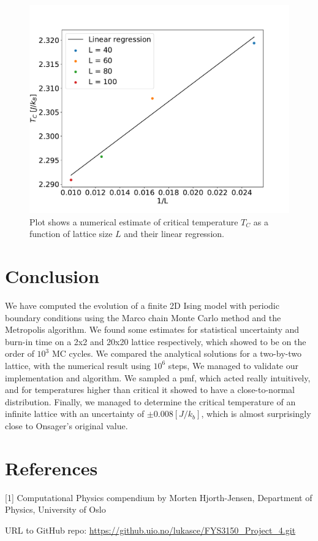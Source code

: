 \documentclass[english,notitlepage,reprint,nofootinbib]{revtex4-1}  %
\begin{document}
\begin{figure}[h!]
    \centering %
    \includegraphics[scale=0.35]{figures/9.pdf} %
    \caption{Plot shows a numerical estimate of critical temperature $T_C$ as a function of lattice size $L$ and their linear regression.}
    \label{fig:8}
\end{figure}
\FloatBarrier






\section{Conclusion}\label{sec:conclusion}
We have computed the evolution of a finite 2D Ising model with periodic boundary conditions using the Marco chain Monte Carlo method and the Metropolis algorithm. We found some estimates for statistical uncertainty and burn-in time on a 2x2 and 20x20 lattice respectively, which showed to be on the order of $10^3$ MC cycles. We compared the analytical solutions for a two-by-two lattice, with the numerical result using $10^6$ steps, We managed to validate our implementation and algorithm. We sampled a pmf, which acted really intuitively, and for temperatures higher than critical it showed to have a close-to-normal distribution. Finally, we managed to determine the critical temperature of an infinite lattice with an uncertainty of $\pm 0.008 [J/k_b]$, which is almost surprisingly close to Onsager's original value.



\section{References}
[1] Computational Physics compendium by  Morten Hjorth-Jensen, Department of Physics, University of Oslo

URL to GitHub repo:
\url{https://github.uio.no/lukasce/FYS3150_Project_4.git}
\end{document}
